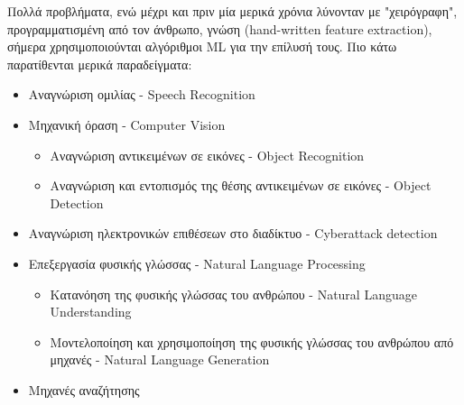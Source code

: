 Πολλά προβλήματα, ενώ μέχρι και πριν μία μερικά χρόνια λύνονταν με
"χειρόγραφη", προγραμματισμένη από τον άνθρωπο, γνώση
(hand-written feature extraction), σήμερα χρησιμοποιούνται
αλγόριθμοι ML για την επίλυσή τους. Πιο κάτω παρατίθενται μερικά
παραδείγματα:
\begin{itemize}
  \item{Αναγνώριση ομιλίας - Speech Recognition}
  \item{Μηχανική όραση - Computer Vision}
  \begin{itemize}
    \item{Αναγνώριση αντικειμένων σε εικόνες - Object Recognition}
    \item{Αναγνώριση και εντοπισμός της θέσης αντικειμένων σε εικόνες - Object Detection}
  \end{itemize}
  \item{Αναγνώριση ηλεκτρονικών επιθέσεων στο διαδίκτυο - Cyberattack detection}
  \item{Επεξεργασία φυσικής γλώσσας - Natural Language Processing}
  \begin{itemize}
    \item{Κατανόηση της φυσικής γλώσσας του ανθρώπου - Natural Language Understanding}
    \item{Μοντελοποίηση και χρησιμοποίηση της φυσικής γλώσσας του ανθρώπου από μηχανές - Natural Language Generation}
  \end{itemize}
  \item{Μηχανές αναζήτησης}
\end{itemize}


